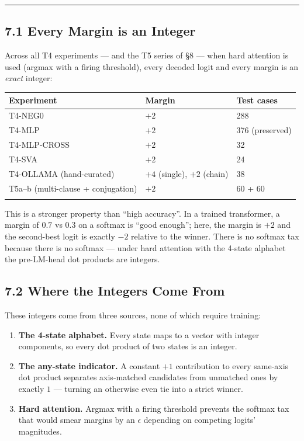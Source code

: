\documentclass[
  twocolumn,
  10pt,
  a4paper]{article}
\providecommand{\tightlist}{%
  \setlength{\itemsep}{0pt}\setlength{\parskip}{0pt}}
\newenvironment{tsxtable}{\begin{center}\footnotesize}{\end{center}}
\let\endhead\relax
\begin{document}
\begin{center}\rule{0.5\linewidth}{0.5pt}\end{center}

\hypertarget{every-margin-is-an-integer}{%
\subsection{7.1 Every Margin is an
Integer}\label{every-margin-is-an-integer}}

Across all T4 experiments --- and the T5 series of §8 --- when hard
attention is used (argmax with a firing threshold), every decoded logit
and every margin is an \emph{exact} integer:

\begin{tsxtable}\begin{tabularx}{\linewidth}{@{}YYY@{}}
\toprule\noalign{}
Experiment & Margin & Test cases \\
\midrule\noalign{}
\endhead
T4-NEG0 & \(+2\) & 288 \\
T4-MLP & \(+2\) & 376 (preserved) \\
T4-MLP-CROSS & \(+2\) & 32 \\
T4-SVA & \(+2\) & 24 \\
T4-OLLAMA (hand-curated) & \(+4\) (single), \(+2\) (chain) & 38 \\
T5a--b (multi-clause + conjugation) & \(+2\) & 60 + 60 \\
\bottomrule\noalign{}
\end{tabularx}\end{tsxtable}

This is a stronger property than ``high accuracy''. In a trained
transformer, a margin of \(0.7\) vs \(0.3\) on a softmax is ``good
enough''; here, the margin is \(+2\) and the second-best logit is
exactly \(-2\) relative to the winner. There is no softmax tax because
there is no softmax --- under hard attention with the 4-state alphabet
the pre-LM-head dot products are integers.

\hypertarget{where-the-integers-come-from}{%
\subsection{7.2 Where the Integers Come
From}\label{where-the-integers-come-from}}

These integers come from three sources, none of which require training:

\begin{enumerate}
\def\labelenumi{\arabic{enumi}.}
\tightlist
\item
  \textbf{The 4-state alphabet.} Every state maps to a vector with
  integer components, so every dot product of two states is an integer.
\item
  \textbf{The any-state indicator.} A constant \(+1\) contribution to
  every same-axis dot product separates axis-matched candidates from
  unmatched ones by exactly \(1\) --- turning an otherwise even tie into
  a strict winner.
\item
  \textbf{Hard attention.} Argmax with a firing threshold prevents the
  softmax tax that would smear margins by an \(\epsilon\) depending on
  competing logits' magnitudes.
\end{enumerate}
\end{document}
